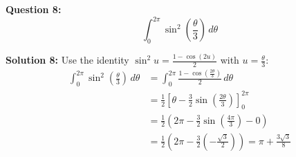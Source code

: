 \documentclass{article}
\begin{document}
\bigskip

\textbf{Question 8:}
\[ \int_0^{2\pi} \sin^2 \left( \frac{\theta}{3} \right) \, d\theta \]

\textbf{Solution 8:}
Use the identity $\sin^2 u = \frac{1 - \cos(2u)}{2}$ with $u = \frac{\theta}{3}$:
\begin{align*} \int_0^{2\pi} \sin^2 \left( \frac{\theta}{3} \right) \, d\theta &= \int_0^{2\pi} \frac{1 - \cos \left( \frac{2\theta}{3} \right)}{2} \, d\theta \\ &= \frac{1}{2} \left[ \theta - \frac{3}{2} \sin \left( \frac{2\theta}{3} \right) \right]_0^{2\pi} \\ &= \frac{1}{2} \left( 2\pi - \frac{3}{2} \sin \left( \frac{4\pi}{3} \right) - 0 \right) \\ &= \frac{1}{2} \left( 2\pi - \frac{3}{2} \left( -\frac{\sqrt{3}}{2} \right) \right) = \pi + \frac{3\sqrt{3}}{8} \end{align*} 
\end{document}
